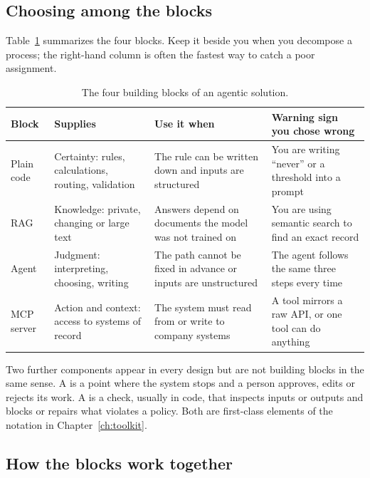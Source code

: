\subsection{Choosing among the blocks}

Table~\ref{tab:blocks} summarizes the four blocks. Keep it beside you when you decompose a process; the right-hand column is often the fastest way to catch a poor assignment.

\begin{table}[htbp]
\centering
\small
\caption{The four building blocks of an agentic solution.}
\label{tab:blocks}
\begin{tabularx}{\textwidth}{@{}>{\raggedright\arraybackslash}p{2.1cm}>{\raggedright\arraybackslash}X>{\raggedright\arraybackslash}X>{\raggedright\arraybackslash}X@{}}
\toprule
Block & Supplies & Use it when & Warning sign you chose wrong \\
\midrule
Plain code & Certainty: rules, calculations, routing, validation & The rule can be written down and inputs are structured & You are writing ``never'' or a threshold into a prompt \\
RAG & Knowledge: private, changing or large text & Answers depend on documents the model was not trained on & You are using semantic search to find an exact record \\
Agent & Judgment: interpreting, choosing, writing & The path cannot be fixed in advance or inputs are unstructured & The agent follows the same three steps every time \\
MCP server & Action and context: access to systems of record & The system must read from or write to company systems & A tool mirrors a raw API, or one tool can do anything \\
\bottomrule
\end{tabularx}
\end{table}

Two further components appear in every design but are not building blocks in the same sense. A  is a point where the system stops and a person approves, edits or rejects its work. A  is a check, usually in code, that inspects inputs or outputs and blocks or repairs what violates a policy. Both are first-class elements of the notation in Chapter~\ref{ch:toolkit}.

\subsection{How the blocks work together}
\label{sec:blocks-together}

